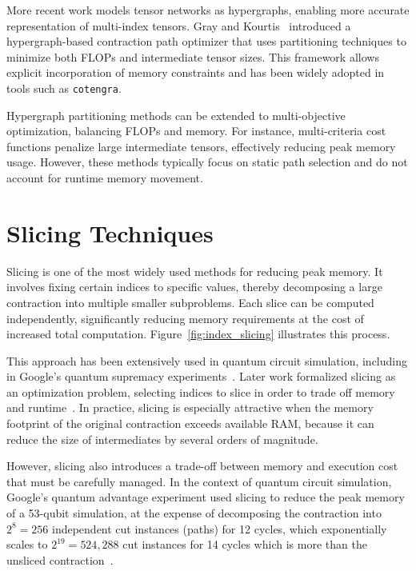 More recent work models tensor networks as hypergraphs, enabling more accurate representation of multi-index tensors. Gray and Kourtis~\cite{gray2021hyper} introduced a hypergraph-based contraction path optimizer that uses partitioning techniques to minimize both \ac{FLOP}s and intermediate tensor sizes. This framework allows explicit incorporation of memory constraints and has been widely adopted in tools such as \texttt{cotengra}.

Hypergraph partitioning methods can be extended to multi-objective optimization, balancing \ac{FLOP}s and memory. For instance, multi-criteria cost functions penalize large intermediate tensors, effectively reducing peak memory usage. However, these methods typically focus on static path selection and do not account for runtime memory movement.

\section{Slicing Techniques}

Slicing is one of the most widely used methods for reducing peak memory. It involves fixing certain indices to specific values, thereby decomposing a large contraction into multiple smaller subproblems. Each slice can be computed independently, significantly reducing memory requirements at the cost of increased total computation. Figure~\ref{fig:index_slicing} illustrates this process.

This approach has been extensively used in quantum circuit simulation, including in Google's quantum supremacy experiments~\cite{arute2019quantum}. Later work formalized slicing as an optimization problem, selecting indices to slice in order to trade off memory and runtime~\cite{gray2021hyper}. In practice, slicing is especially attractive when the memory footprint of the original contraction exceeds available RAM, because it can reduce the size of intermediates by several orders of magnitude.

However, slicing also introduces a trade-off between memory and execution cost that must be carefully managed. In the context of quantum circuit simulation, Google's quantum advantage experiment used slicing to reduce the peak memory of a 53-qubit simulation, at the expense of decomposing the contraction into $2^8 = 256$ independent cut instances (paths) for 12 cycles, which exponentially scales to $2^{19} = 524,288$ cut instances for 14 cycles which is more than the unsliced contraction~\cite{arute2019quantum}. 

